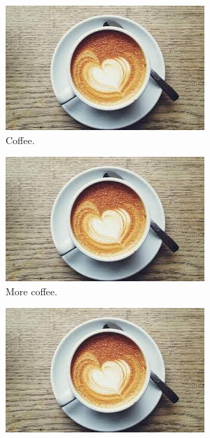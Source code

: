 \documentclass{article}
\begin{document}
\begin{figure}[h!]
    \centering
    \begin{subfigure}[b]{0.2\linewidth}
        \includegraphics[width=\linewidth]{coffee.jpg}
        \caption{Coffee.}
    \end{subfigure}
    \begin{subfigure}[b]{0.2\linewidth}
        \includegraphics[width=\linewidth]{coffee.jpg}
        \caption{More coffee.}
    \end{subfigure}
    \begin{subfigure}[b]{0.2\linewidth}
        \includegraphics[width=\linewidth]{coffee.jpg}

\end{subfigure}
\end{figure}
\end{document}

